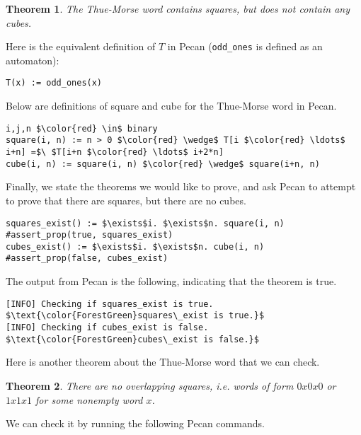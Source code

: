 \documentclass[landscape,usenames,dvipsnames]{sciposter}
\newtheorem{thm}{Theorem}%
\begin{document}
\begin{multicols}{3}
\begin{thm}
    The Thue-Morse word contains squares, but does not contain any cubes.
\end{thm}

Here is the equivalent definition of $T$ in Pecan (\texttt{odd\_ones} is defined as an automaton):
\begin{lstlisting}[language=pecan, basicstyle=\normalsize\ttfamily, mathescape=true, frame=single]
T(x) := odd_ones(x)
\end{lstlisting}

Below are definitions of square and cube for the Thue-Morse word in Pecan.

\begin{lstlisting}[language=pecan, basicstyle=\normalsize\ttfamily, mathescape=true, frame=single]
i,j,n $\color{red} \in$ binary
square(i, n) := n > 0 $\color{red} \wedge$ T[i $\color{red} \ldots$ i+n] =$\ $T[i+n $\color{red} \ldots$ i+2*n]
cube(i, n) := square(i, n) $\color{red} \wedge$ square(i+n, n)
\end{lstlisting}

Finally, we state the theorems we would like to prove, and ask Pecan to attempt to prove that there are squares, but there are no cubes.

\begin{lstlisting}[language=pecan, basicstyle=\normalsize\ttfamily, mathescape=true, frame=single]
squares_exist() := $\exists$i. $\exists$n. square(i, n)
#assert_prop(true, squares_exist)
cubes_exist() := $\exists$i. $\exists$n. cube(i, n)
#assert_prop(false, cubes_exist)
\end{lstlisting}

The output from Pecan is the following, indicating that the theorem is true.
\begin{lstlisting}[basicstyle=\normalsize\ttfamily, mathescape=true, frame=single]
[INFO] Checking if squares_exist is true.
$\text{\color{ForestGreen}squares\_exist is true.}$
[INFO] Checking if cubes_exist is false.
$\text{\color{ForestGreen}cubes\_exist is false.}$
\end{lstlisting}

Here is another theorem about the Thue-Morse word that we can check.
\begin{thm}
There are no overlapping squares, i.e. words of form $0x0x0$ or $1x1x1$ for some nonempty word $x$. 
\end{thm}
We can check it by running the following Pecan commands.


\end{multicols}
\end{document}
